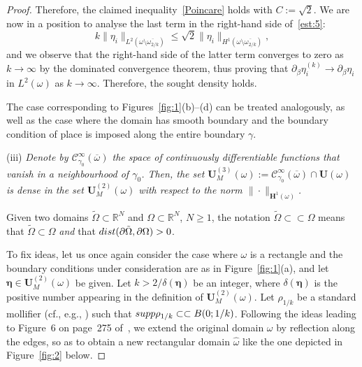 \documentclass{amsart}
\begin{document}
\begin{proof}
	Therefore, the claimed inequality~\eqref{Poincare} holds with $C:=\sqrt{2}$. We are now in a position to analyse the last term in the right-hand side of~\eqref{est:5}:
	\begin{equation*}
		k\|\eta_i\|_{L^2(\omega\setminus\overline{\omega_{2/k}})}\le \sqrt{2}\|\eta_i\|_{H^1(\omega\setminus\overline{\omega_{2/k}})},
	\end{equation*}
	and we observe that the right-hand side of the latter term converges to zero as $k\to\infty$ by the dominated convergence theorem, thus proving that $\partial_\beta\eta_i^{(k)} \to\partial_\beta\eta_i$ in $L^2(\omega)$ as $k\to\infty$. Therefore, the sought density holds.
	
	The case corresponding to Figures~\ref{fig:1}(b)--(d) can be treated analogously, as well as the case where the domain has smooth boundary and the boundary condition of place is imposed along the entire boundary $\gamma$.
	
	(iii) \emph{Denote by $\mathcal{C}_{\gamma_0}^\infty(\overline{\omega})$ the space of continuously differentiable functions that vanish in a neighbourhood of $\gamma_0$.
		Then, the set $\bm{U}_M^{(3)}(\omega):=\bm{\mathcal{C}}_{\gamma_0}^\infty(\overline{\omega}) \cap \bm{U}(\omega)$ is dense in the set $\bm{U}_M^{(2)}(\omega)$ with respect to the norm $\|\cdot\|_{\bm{H}^1(\omega)}$.}
	
	Given two domains $\tilde{\Omega}\subset\mathbb{R}^N$ and $\Omega\subset\mathbb{R}^N$, $N \ge 1$, the notation $\tilde{\Omega}\subset\subset\Omega$ means that $\tilde{\Omega}\subset\Omega$ \emph{and} that $\textup{dist}(\partial\tilde{\Omega},\partial\Omega)>0$.
	
	To fix ideas, let us once again consider the case where $\omega$ is a rectangle and the boundary conditions under consideration are as in Figure~\ref{fig:1}(a), and let $\bm{\eta}\in\bm{U}_M^{(2)}(\omega)$ be given. Let $k>2/\delta(\bm{\eta})$ be an integer, where $\delta(\bm{\eta})$ is the positive number appearing in the definition of $\bm{U}_M^{(2)}(\omega)$. Let $\rho_{1/k}$ be a standard mollifier (cf., e.g., \cite{Brez11}) such that $\textup{supp }\rho_{1/k} \subset\subset B(0;1/k)$. Following the ideas leading to Figure~6 on page~275 of~\cite{Brez11}, we extend the original domain $\omega$ by reflection along the edges, so as to obtain a new rectangular domain $\hat{\omega}$ like the one depicted in Figure~\ref{fig:2} below.
	

\end{proof}
\end{document}
